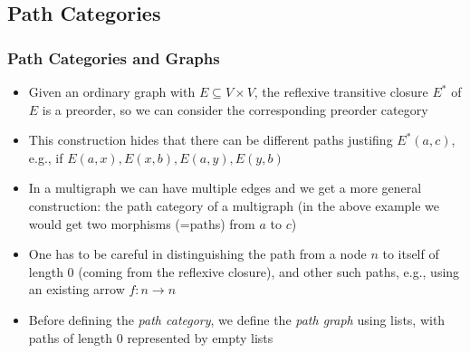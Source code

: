 \documentclass[handout]{beamer}
\begin{document}
\subsection{Path Categories}

\frame
  {   
    \frametitle{Path Categories and Graphs}\label{Ch2:PathCatsGras}

 \begin{itemize}[<+->]
\item Given an ordinary graph with $E\subseteq V\times V$, the
reflexive transitive closure $E^*$ of $E$ is a preorder,
so we can consider the corresponding preorder category
\item This construction hides that there can be different paths
justifing $E^*(a,c)$, e.g., if $E(a,x), E(x,b), E(a,y), E(y,b)$
\item In a multigraph we can have multiple edges and we get
a more general construction: the path category of a multigraph
(in the above example we would get two morphisms (=paths) from $a$ to $c$)
\item One has to be careful in distinguishing the path from a node $n$ to itself
of length 0 (coming from the reflexive closure), and other such paths, 
e.g., using an existing arrow $f: n\to n$
\item Before defining the \emph{path category}, we define the
\emph{path graph} using lists, with paths of length 0 represented by empty lists
 \end{itemize}

 }
\end{document}
